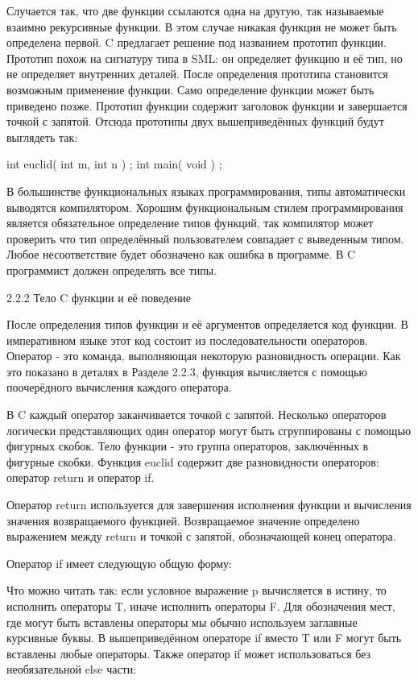 Случается так, что две функции ссылаются одна на другую, так называемые взаимно рекурсивные функции. В этом случае никакая функция не может быть определена первой. C предлагает решение под названием прототип функции. Прототип похож на сигнатуру типа в SML: он определяет функцию и её тип, но не определяет внутренних деталей. После определения прототипа становится возможным применение функции. Само определение функции может быть приведено позже. Прототип функции содержит заголовок функции и завершается точкой с запятой. Отсюда прототипы двух вышеприведённых функций будут выглядеть так:

int euclid( int m, int n ) ;
int main( void ) ;

В большинстве функциональных языках программирования, типы автоматически выводятся компилятором. Хорошим функциональным стилем программирования является обязательное определение типов функций, так компилятор может проверить что тип определённый пользователем совпадает с выведенным типом. Любое несоответствие будет обозначено как ошибка в программе. В C программист должен определять все типы.

2.2.2 Тело C функции и её поведение

После определения типов функции и её аргументов определяется код функции. В императивном языке этот код состоит из последовательности операторов. Оператор - это команда, выполняющая некоторую разновидность операции. Как это показано в деталях в Разделе 2.2.3, функция вычисляется с помощью поочерёдного вычисления каждого оператора.

В C каждый оператор заканчивается точкой с запятой. Несколько операторов логически представляющих один оператор могут быть сгруппированы с помощью фигурных скобок. Тело функции - это группа операторов, заключённых в фигурные скобки. Функция euclid содержит две разновидности операторов: оператор return и оператор if.

Оператор return используется для завершения исполнения функции и вычисления значения возвращаемого функцией. Возвращаемое значение определено выражением между return и точкой с запятой, обозначающей конец оператора.

Оператор if имеет следующую общую форму:

Что можно читать так: если условное выражение p вычисляется в истину, то исполнить операторы T, иначе исполнить операторы F. Для обозначения мест, где могут быть вставлены операторы мы обычно используем заглавные курсивные буквы. В вышеприведённом операторе if вместо T или F могут быть вставлены любые операторы. Также оператор if может использоваться без необязательной else части:

